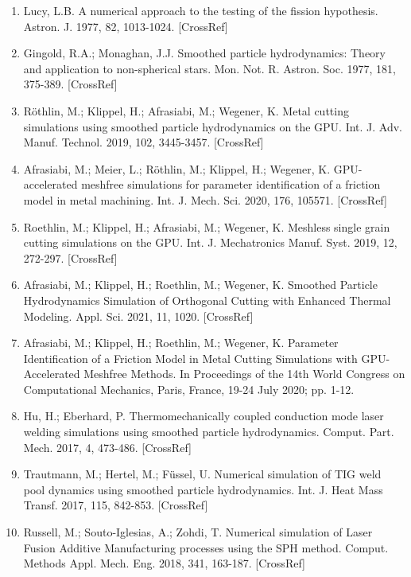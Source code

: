 \documentclass[10pt]{article}
\begin{document}
\begin{enumerate}
  \item Lucy, L.B. A numerical approach to the testing of the fission hypothesis. Astron. J. 1977, 82, 1013-1024. [CrossRef]

  \item Gingold, R.A.; Monaghan, J.J. Smoothed particle hydrodynamics: Theory and application to non-spherical stars. Mon. Not. R. Astron. Soc. 1977, 181, 375-389. [CrossRef]

  \item Röthlin, M.; Klippel, H.; Afrasiabi, M.; Wegener, K. Metal cutting simulations using smoothed particle hydrodynamics on the GPU. Int. J. Adv. Manuf. Technol. 2019, 102, 3445-3457. [CrossRef]

  \item Afrasiabi, M.; Meier, L.; Röthlin, M.; Klippel, H.; Wegener, K. GPU-accelerated meshfree simulations for parameter identification of a friction model in metal machining. Int. J. Mech. Sci. 2020, 176, 105571. [CrossRef]

  \item Roethlin, M.; Klippel, H.; Afrasiabi, M.; Wegener, K. Meshless single grain cutting simulations on the GPU. Int. J. Mechatronics Manuf. Syst. 2019, 12, 272-297. [CrossRef]

  \item Afrasiabi, M.; Klippel, H.; Roethlin, M.; Wegener, K. Smoothed Particle Hydrodynamics Simulation of Orthogonal Cutting with Enhanced Thermal Modeling. Appl. Sci. 2021, 11, 1020. [CrossRef]

  \item Afrasiabi, M.; Klippel, H.; Roethlin, M.; Wegener, K. Parameter Identification of a Friction Model in Metal Cutting Simulations with GPU-Accelerated Meshfree Methods. In Proceedings of the 14th World Congress on Computational Mechanics, Paris, France, 19-24 July 2020; pp. 1-12.

  \item Hu, H.; Eberhard, P. Thermomechanically coupled conduction mode laser welding simulations using smoothed particle hydrodynamics. Comput. Part. Mech. 2017, 4, 473-486. [CrossRef]

  \item Trautmann, M.; Hertel, M.; Füssel, U. Numerical simulation of TIG weld pool dynamics using smoothed particle hydrodynamics. Int. J. Heat Mass Transf. 2017, 115, 842-853. [CrossRef]

  \item Russell, M.; Souto-Iglesias, A.; Zohdi, T. Numerical simulation of Laser Fusion Additive Manufacturing processes using the SPH method. Comput. Methods Appl. Mech. Eng. 2018, 341, 163-187. [CrossRef]


\end{enumerate}
\end{document}
